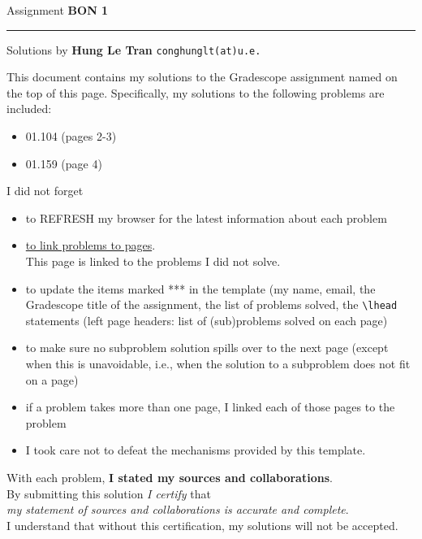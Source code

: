 \documentclass{amsart}
\begin{document}
\Large
\noindent
Assignment {\bf BON 1}   %

\medskip\noindent
\hrule


\medskip\noindent
Solutions by {\bf Hung Le Tran} \qquad   %
  {\tt conghunglt(at)u.e.}      %

\vspace{0.5cm}

\noindent
This document contains my solutions to
the Gradescope assignment named on the top of this page.
Specifically, my solutions to the following problems
are included:

\vspace{0.4cm}
\begin{itemize}  %
\item 01.104 (pages 2-3)
\item 01.159 (page 4)
\end{itemize}

\vspace{0.5cm}

\noindent
I did not forget 
\begin{itemize}
  \item to REFRESH my browser for the latest information
   about each problem
  \item \underline{to link problems to pages}.\\
  This page is linked to the problems I did not solve.
\item to update the items marked *** in the template
  (my name, email, the Gradescope title of the assignment,
  the list of problems solved, the \verb>\lhead> statements
  (left page headers: list of (sub)problems solved on each page)
\item to make sure no subproblem solution spills over to the next page
  (except when this is unavoidable, i.e., when the solution to a
  subproblem does not fit on a page)
\item if a problem takes more than one page, I linked
  each of those pages to the problem
\item I took care not to defeat the mechanisms provided by this template.
\end{itemize}
  With each problem, {\bf I stated my sources and collaborations}.\\
  By submitting this solution \emph{I certify} that\\
  \emph{my statement of sources and collaborations is accurate and complete}.\\
  I understand that without this certification, my solutions will
  not be accepted.
  
\end{document}
